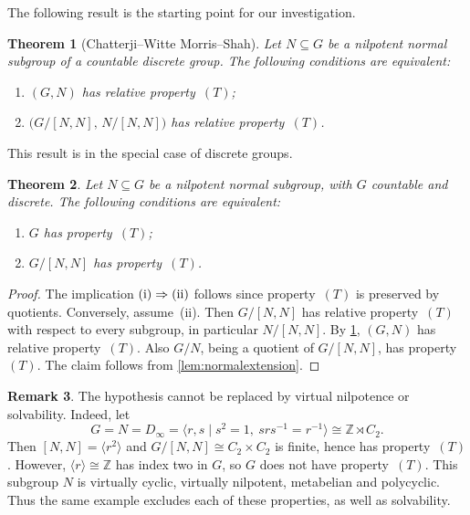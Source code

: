 \documentclass[11pt,a4paper]{article}
\newtheorem{theorem}{Theorem}[section]
\theoremstyle{definition}
\newtheorem{remark}[theorem]{Remark}
\newcommand{\Z}{\mathbb Z}
\newcommand{\rt}{(T)}
\begin{document}
The following result is the starting point for our investigation.
\begin{theorem}[Chatterji--Witte Morris--Shah]
\label{thm:cwms}
Let \(N\subseteq G\) be a nilpotent normal subgroup of a countable
discrete group. The following conditions are equivalent:
\begin{enumerate}[label=\textup{(\roman*)},beginpenalty=10000,midpenalty=10000]
 \item \((G,N)\) has relative property~\(\rt\);
 \item \(\bigl(G/[N,N],\,N/[N,N]\bigr)\) has relative
 property~\(\rt\).
\end{enumerate}
\end{theorem}

This result is \cite[Theorem~1.2]{CWMS} in the special case of discrete groups. 

\begin{theorem}
\label{thm:nilpotentpermanence}
Let \(N\subseteq G\) be a nilpotent normal subgroup, with \(G\)
countable and discrete. The following conditions are equivalent:
\begin{enumerate}[label=\textup{(\roman*)},beginpenalty=10000,midpenalty=10000]
 \item \(G\) has property~\(\rt\);
 \item \(G/[N,N]\) has property~\(\rt\).
\end{enumerate}
\end{theorem}
\begin{proof}
The implication \(\textup{(i)}\Rightarrow\textup{(ii)}\) follows since property~\(\rt\) is preserved by quotients. 
Conversely, assume~(ii). Then \(G/[N,N]\) has relative property~\(\rt\)
with respect to every subgroup, in particular \(N/[N,N]\).
By \cref{thm:cwms}, \((G,N)\) has relative property~\(\rt\).
Also \(G/N\), being a quotient of \(G/[N,N]\), has
property~\(\rt\). The claim follows from \cref{lem:normalextension}.
\end{proof}

\begin{remark}
\label{rem:nilpotenceessential}
The hypothesis cannot be replaced by virtual nilpotence or
solvability. Indeed, let
\[
 G=N=D_\infty
 =\langle r,s\mid s^2=1,\ srs^{-1}=r^{-1}\rangle
 \cong\Z\rtimes C_2.
\]
Then \([N,N]=\langle r^2\rangle\) and
\(G/[N,N]\cong C_2\times C_2\) is finite, hence has
property~\(\rt\). However, \(\langle r\rangle\cong\Z\)
has index two in \(G\), so \(G\) does not have
property~\(\rt\).
This subgroup \(N\) is virtually cyclic, virtually nilpotent,
metabelian and polycyclic. Thus the same example excludes each
of these properties, as well as solvability. 
\end{remark}
\end{document}
